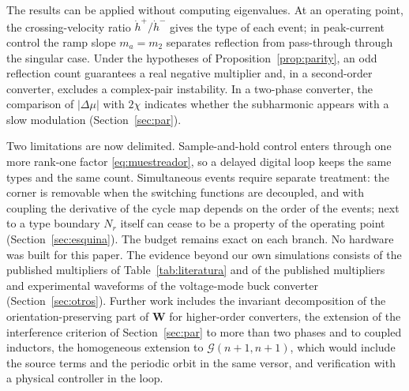 \documentclass[journal]{IEEEtran}
\begin{document}
The results can be applied without computing eigenvalues. At an operating
point, the crossing-velocity ratio $\dot h^{+}/\dot h^{-}$ gives the type
of each event; in peak-current control the ramp slope $m_a=m_2$ separates
reflection from pass-through through the singular case. Under the hypotheses
of Proposition~\ref{prop:parity}, an odd reflection count guarantees a real
negative multiplier and, in a second-order converter, excludes a
complex-pair instability. In a two-phase converter, the comparison of
$\lvert\Delta\mu\rvert$ with $2\chi$ indicates whether the subharmonic
appears with a slow modulation (Section~\ref{sec:par}).

Two limitations are now delimited. Sample-and-hold control enters through
one more rank-one factor \eqref{eq:muestreador}, so a delayed digital loop
keeps the same types and the same count. Simultaneous events require
separate treatment: the corner is removable when the switching functions
are decoupled, and with coupling the derivative of the cycle map depends on
the order of the events; next to a type boundary $N_r$ itself can cease
to be a property of the operating point (Section~\ref{sec:esquina}). The
budget remains exact on each branch. No hardware was built for this paper.
The evidence beyond our own simulations consists of the published
multipliers of Table~\ref{tab:literatura} and of the published multipliers
and experimental waveforms of the voltage-mode buck converter
(Section~\ref{sec:otros}). Further work includes the invariant decomposition
\cite{roelfs2023graded} of the orientation-preserving part of $\bm{W}$ for
higher-order converters, the extension of the interference criterion of
Section~\ref{sec:par} to more than two phases and to coupled inductors, the
homogeneous extension
to $\mathcal{G}(n+1,n+1)$, which would include the source terms and the
periodic orbit in the same versor, and verification with a physical
controller in the loop.
\end{document}
